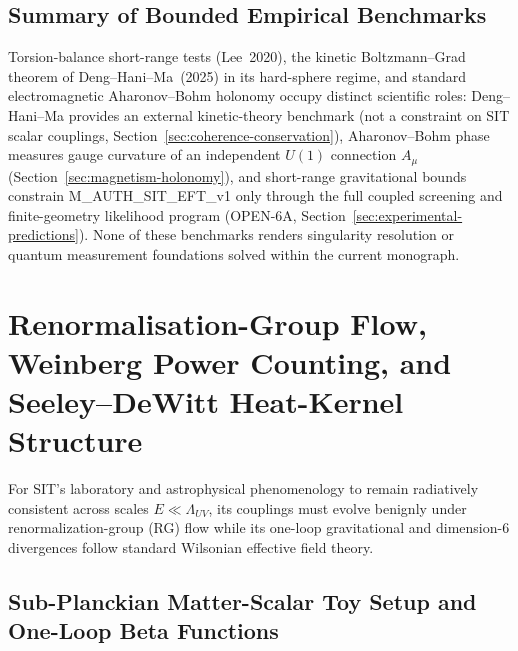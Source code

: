 \documentclass[american,11pt,letterpaper]{article}
\def\mathrm#1{#1}%
\def\texttt#1{#1}%
\begin{document}
\subsection{Summary of Bounded Empirical Benchmarks}

Torsion-balance short-range tests (Lee~2020), the kinetic Boltzmann--Grad theorem of Deng--Hani--Ma~(2025) in its hard-sphere regime, and standard electromagnetic Aharonov--Bohm holonomy occupy distinct scientific roles: Deng--Hani--Ma provides an external kinetic-theory benchmark (not a constraint on SIT scalar couplings, Section~\ref{sec:coherence-conservation}), Aharonov--Bohm phase measures gauge curvature of an independent $U(1)$ connection $A_\mu$ (Section~\ref{sec:magnetism-holonomy}), and short-range gravitational bounds constrain \texttt{M\_AUTH\_SIT\_EFT\_v1} only through the full coupled screening and finite-geometry likelihood program (\texttt{OPEN-6A}, Section~\ref{sec:experimental-predictions}). None of these benchmarks renders singularity resolution or quantum measurement foundations solved within the current monograph.



\section{Renormalisation-Group Flow, Weinberg Power Counting, and Seeley--DeWitt Heat-Kernel Structure}
\label{sec:rg-heat-kernel}

For SIT's laboratory and astrophysical phenomenology to remain radiatively consistent across scales $E \ll \Lambda_{\mathrm{UV}}$, its couplings must evolve benignly under renormalization-group (RG) flow while its one-loop gravitational and dimension-6 divergences follow standard Wilsonian effective field theory.

\subsection{Sub-Planckian Matter-Scalar Toy Setup and One-Loop Beta Functions}
\end{document}
